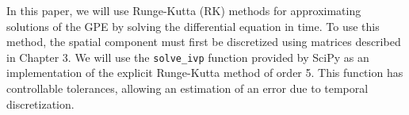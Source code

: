 In this paper, we will use Runge-Kutta (RK) methods for approximating solutions of the GPE by solving the differential equation in time. To use this method, the spatial component must first be discretized using matrices described in Chapter 3. We will use the \texttt{solve\_ivp} function provided by SciPy as an implementation of the explicit Runge-Kutta method of order 5. This function has controllable tolerances, allowing an estimation of an error due to temporal discretization. 